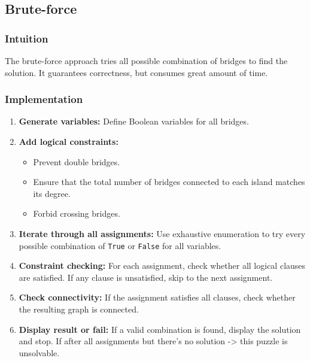 \subsection{Brute-force}

\subsubsection{Intuition}
The brute-force approach tries all possible combination of bridges to find the solution.
It guarantees correctness, but consumes great amount of time.

\subsubsection{Implementation}

\begin{enumerate}
  \item \textbf{Generate variables:} Define Boolean variables for all bridges.

  \item \textbf{Add logical constraints:}
  \begin{itemize}
    \item Prevent double bridges.
    \item Ensure that the total number of bridges connected to each island matches its degree.
    \item Forbid crossing bridges.
  \end{itemize}

  \item \textbf{Iterate through all assignments:}
  Use exhaustive enumeration to try every possible combination of \texttt{True} or \texttt{False} for all variables.

  \item \textbf{Constraint checking:}
  For each assignment, check whether all logical clauses are satisfied. If any clause is unsatisfied, skip to the next assignment.

  \item \textbf{Check connectivity:}
  If the assignment satisfies all clauses, check whether the resulting graph is connected.

  \item \textbf{Display result or fail:}
  If a valid combination is found, display the solution and stop. If after all assignments but there's no solution -> this puzzle is unsolvable.
\end{enumerate}